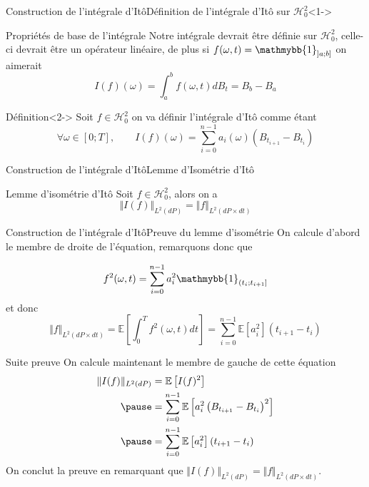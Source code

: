 \documentclass{beamer}
\newcommand{\1}{\mathmybb{1}}
\begin{document}
    \begin{frame}{Construction de l'intégrale d'Itô}{Définition de l'intégrale d'Itô sur $\mathcal{H}^2_0$}<1->
      \begin{block}{Propriétés de base de l'intégrale}
        Notre intégrale devrait être définie sur $\mathcal{H}^{2}_{0}$, celle-ci devrait être un opérateur linéaire, de plus
     si $ f(\omega, t) = \1_{\left] a; b \right]} $ on aimerait
     \[
       I(f)(\omega) = \int_{a}^{b}f(\omega, t) dB_{t} = B_{b} - B_{a}
     \]
   \end{block}
     \begin{block}{Définition}<2->
       Soit $ f \in \mathcal{H}^{2}_{0} $ on va définir l'intégrale d'Itô comme étant
       \[
         \forall \omega \in [0; T], \qquad I(f)(\omega) = \sum_{i=0}^{n-1} a_{i}(\omega)\left( B_{t_{i+1}} - B_{t_{i}} \right)
       \]
     \end{block}
   \end{frame}
   \begin{frame}{Construction de l'intégrale d'Itô}{Lemme d'Isométrie d'Itô}
     \begin{block}{Lemme d'isométrie d'Itô}
       Soit $f \in \mathcal{H}_{0}^{2}$, alors on a
       \[
         \Vert I(f) \Vert_{L^{2}(dP)} = \Vert f \Vert_{L^{2}(dP \times dt)}
       \]
     \end{block}
     \end{frame}
    \begin{frame}{Construction de l'intégrale d'Itô}{Preuve du lemme d'isométrie}
       On calcule d'abord le membre de droite de l'équation, remarquons donc que

       \[
       f ^{2}(\omega, t) = \sum_{i=0}^{n-1}a^{2}_{i} \1 _{\left( t_{i} ; t_{i+1} \right]}
     \]
     \pause
     et donc
     \[
      \Vert f \Vert _{L^{2}(dP \times dt)} =\mathbb{E} \left[ \int_{0}^{T} f^{2} (\omega, t) dt \right] = \sum_{i=0}^{n-1} \mathbb{E}\left[  a^{2}_{i}\right] (t_{i+1} - t_i)
    \]
  \end{frame}
  \begin{frame}{Suite preuve}
  On calcule maintenant le membre de gauche de cette équation
  \pause
    \[
    \begin{aligned}
      \Vert I(f) \Vert _{L^{2}(dP)} &= \mathbb{E}\left[ I(f)^{2} \right] \\ \pause
                                    &= \sum_{i=0}^{n-1} \mathbb{E} \left[a^{2}_{i} \left( B_{t_{i+1}} - B_{t_{i}} \right)^{2} \right] \\ \pause
      &= \sum_{i=0}^{n-1} \mathbb{E} \left[ a_{i}^{2} \right] (t_{i+1} - t_{i})
    \end{aligned}
  \]
  \pause
  On conclut la preuve en remarquant que $\Vert I(f) \Vert _{L^{2}(dP)} = \Vert f \Vert _{L^{2}(dP \times dt)}$.
     \end{frame}
\end{document}
